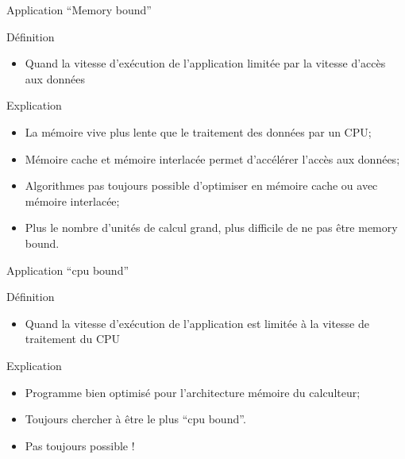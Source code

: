 \documentclass[handout,francais]{beamer}
\begin{document}
\begin{frame}[fragile]{Application ``Memory bound''}
 
 \begin{block}{Définition}
  \begin{itemize}
   \item Quand la vitesse d'exécution de l'application limitée par la vitesse d'accès aux données
  \end{itemize}
 \end{block}

 \begin{block}{Explication}
  \begin{itemize}
   \item La mémoire vive plus lente que le traitement des données par un CPU;
   \item Mémoire cache et mémoire interlacée permet d'accélérer l'accès aux données;
   \item Algorithmes pas toujours possible d'optimiser en mémoire cache ou avec mémoire interlacée;
   \item Plus le nombre d'unités de calcul grand, plus difficile de ne pas être memory bound.
  \end{itemize}

 \end{block}

 
\end{frame}

\begin{frame}[fragile]{Application ``cpu bound''}
 
\begin{block}{Définition}
 \begin{itemize}
  \item Quand la vitesse d'exécution de l'application est limitée à la vitesse de traitement du CPU
 \end{itemize}
\end{block}

\begin{block}{Explication}
 \begin{itemize}
  \item Programme bien optimisé pour l'architecture mémoire du calculteur;
  \item Toujours chercher à être le plus ``cpu bound''.
  \item Pas toujours possible !
 \end{itemize}

\end{block}

\end{frame}
\end{document}
